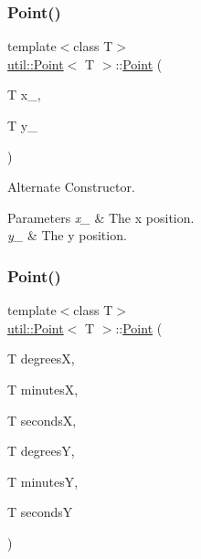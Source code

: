 \subsubsection{\texorpdfstring{Point()}{Point()}\hspace{0.1cm}{\footnotesize\ttfamily [3/5]}}
{\footnotesize\ttfamily template$<$class T$>$ \\
\hyperlink{classutil_1_1Point}{util\+::\+Point}$<$ T $>$\+::\hyperlink{classutil_1_1Point}{Point} (\begin{DoxyParamCaption}\item[{T}]{x\+\_\+,  }\item[{T}]{y\+\_\+ }\end{DoxyParamCaption})\hspace{0.3cm}{\ttfamily [inline]}}



Alternate Constructor. 


\begin{DoxyParams}{Parameters}
{\em x\+\_\+} & The x position. \\
\hline
{\em y\+\_\+} & The y position. \\
\hline
\end{DoxyParams}
\mbox{\label{classutil_1_1Point_ab79142480eae4e5730eb72bace4234fe}} 
\subsubsection{\texorpdfstring{Point()}{Point()}\hspace{0.1cm}{\footnotesize\ttfamily [4/5]}}
{\footnotesize\ttfamily template$<$class T$>$ \\
\hyperlink{classutil_1_1Point}{util\+::\+Point}$<$ T $>$\+::\hyperlink{classutil_1_1Point}{Point} (\begin{DoxyParamCaption}\item[{T}]{degreesX,  }\item[{T}]{minutesX,  }\item[{T}]{secondsX,  }\item[{T}]{degreesY,  }\item[{T}]{minutesY,  }\item[{T}]{secondsY }\end{DoxyParamCaption})\hspace{0.3cm}{\ttfamily [inline]}}




